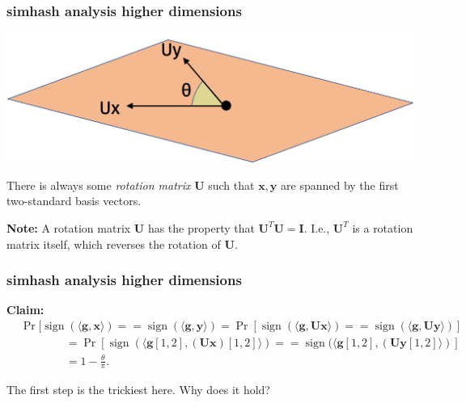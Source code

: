 \documentclass[compress]{beamer}
\newcommand{\bv}[1]{\mathbf{#1}}
\DeclareMathOperator{\sign}{sign}
\begin{document}
\begin{frame}
	\frametitle{simhash analysis higher dimensions}
	\begin{center}
		\includegraphics[width=.7\textwidth]{high_dim2.png}
	\end{center}
	There is always some \emph{rotation matrix} $\bv{U}$ such that $\bv{x},\bv{y}$ are spanned by the first two-standard basis vectors. 
	
	
	\textbf{Note:} A rotation matrix $\bv{U}$ has the property that $\bv{U}^T\bv{U} = \bv{I}$. I.e., $\bv{U}^T$ is a rotation matrix itself, which reverses the rotation of $\bv{U}$.
\end{frame}

\begin{frame}[t]
	\frametitle{simhash analysis higher dimensions}
\textbf{Claim:} 
\begin{align*}
	&\Pr[\sign(\langle \bv{g}, \bv{x} \rangle) == \sign(\langle \bv{g}, \bv{y} \rangle) = \Pr[\sign(\langle \bv{g}, \bv{U}\bv{x} \rangle) == \sign(\langle \bv{g}, \bv{U}\bv{y} \rangle)] \\
	&\hspace{4em}= \Pr[\sign(\langle \bv{g}[1,2], (\bv{U}\bv{x})[1,2] \rangle) == \sign(\langle \bv{g}[1,2], (\bv{U}\bv{y}[1,2] \rangle)]\\
	&\hspace{4em} = 1 - \frac{\theta}{\pi}.
	\end{align*}

	The first step is the trickiest here. Why does it hold?
\end{frame}
\end{document}
